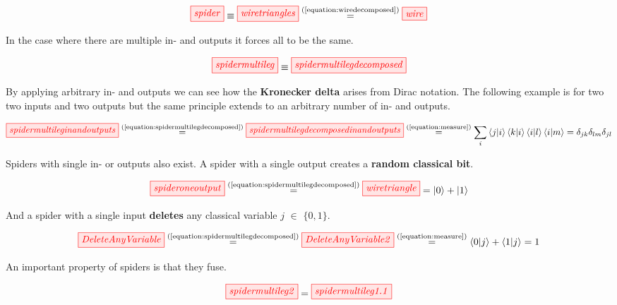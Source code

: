 \documentclass[]{article}
\newcommand{\equaltext}[1]{\ensuremath{\stackrel{\text{#1}}{=}}}
\begin{document}
\begin{equation}
\label{equation:boringspider}
\tikzfig{spider} \equiv \tikzfig{wiretriangles} \equaltext{(\ref{equation:wiredecomposed})} \tikzfig{wire}
\end{equation}

In the case where there are multiple in- and outputs it forces all to be the same.

\begin{equation}
\label{equation:spidermultilegdecomposed}
\tikzfig{spidermultileg} \equiv \tikzfig{spidermultilegdecomposed}
\end{equation}

By applying arbitrary in- and outputs we can see how the \textbf{Kronecker delta} arises from Dirac notation. The following example is for two two inputs and two outputs but the same principle extends to an arbitrary number of in- and outputs.

\begin{equation}
\begin{split}
\tikzfig{spidermultileginandoutputs} \equaltext{(\ref{equation:spidermultilegdecomposed})} \tikzfig{spidermultilegdecomposedinandoutputs} \equaltext{(\ref{equation:measure})} \sum_{i} \bra{j}\ket{i}\bra{k}\ket{i}\bra{i}\ket{l}\bra{i}\ket{m} = \delta_{jk} \delta_{lm}  \delta_{jl}
\end{split}
\end{equation}

Spiders with single in- or outputs also exist. A spider with a single output creates a 
\textbf{random classical bit}.

\begin{equation}
\label{equation:spideroneoutput}
\tikzfig{spideroneoutput} \equaltext{(\ref{equation:spidermultilegdecomposed})} \tikzfig{wiretriangle} = \ket{0} + \ket{1}
\end{equation}

And a spider with a single input \textbf{deletes} any classical variable $j$ $\in$ $\{0,1\}$.

\begin{equation}
\label{equation:deleteanyvariable}
 \tikzfig{DeleteAnyVariable} \equaltext{(\ref{equation:spidermultilegdecomposed})} \tikzfig{DeleteAnyVariable2} \equaltext{(\ref{equation:measure})}  \bra{0}\ket{j} + \bra{1}\ket{j} = 1
\end{equation}

An important property of spiders is that they fuse.

\begin{equation}
\label{equation:spiderfusion}
	\tikzfig{spidermultileg2} = \tikzfig{spidermultileg1.1}
\end{equation}
\end{document}
